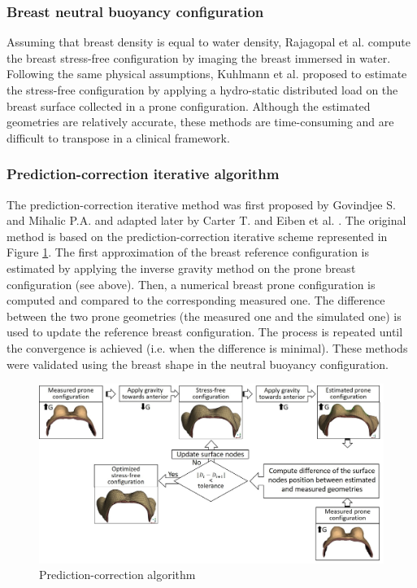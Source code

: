  \subsubsection*{Breast neutral buoyancy configuration}
 Assuming that breast density is equal to water density, Rajagopal et al. \citep{rajagopal_creating_2008} compute the breast stress-free configuration by imaging the breast immersed in water. Following the same physical assumptions, Kuhlmann et al. \citep{kuhlmann_mechanical_2013} proposed to estimate the stress-free configuration by applying a hydro-static distributed load on the breast surface collected in a prone configuration. Although the estimated geometries are relatively accurate, these methods are time-consuming and are difficult to transpose in a clinical framework. 

 \subsubsection*{Prediction-correction iterative algorithm}
 The prediction-correction iterative method was first proposed by Govindjee S. and Mihalic P.A. \citep{govindjee_computational_1998} and adapted later by Carter T. \citep{carter_biomechanical_2009} and Eiben et al. \citep{eiben_breast_2014}. The original method is based on the prediction-correction iterative scheme represented in Figure \ref{predictioncorectionalgo}. The first approximation of the breast reference configuration is estimated by applying the inverse gravity method on the prone breast configuration (see above).  Then, a numerical breast prone configuration is computed and compared to the corresponding measured one. The difference between the two prone geometries (the measured one and the simulated one) is used to update the reference breast configuration. The process is repeated until the convergence is achieved (i.e. when the difference is minimal). These methods were validated using the breast shape in the neutral buoyancy configuration.

\begin{figure}[!h]
\centering
\includegraphics[width=1\textwidth,keepaspectratio]{figures/prediction-correction.jpg} 
\caption{Prediction-correction algorithm}\label{predictioncorectionalgo}
\end{figure}


